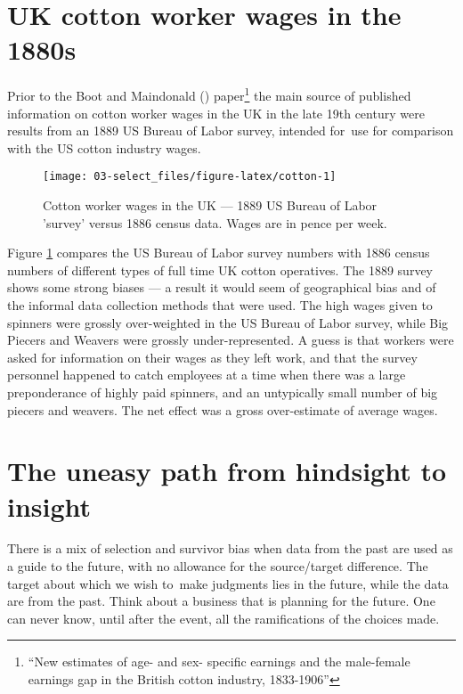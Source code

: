 \documentclass[
  10ptls,
  b5paper]{book}
\begin{document}
\section{UK cotton worker wages in the 1880s}\label{uk-cotton-worker-wages-in-the-1880s}

Prior to the Boot and Maindonald () paper\footnote{``New estimates of age- and sex- specific
  earnings and the male-female earnings gap in the British cotton
  industry, 1833-1906''} the main source of published information on
cotton worker wages in the UK in the late 19th century were results
from an 1889 US Bureau of Labor survey, intended for~use for
comparison with the US cotton industry wages.

\begin{figure}

{\centering \texttt{[image: 03-select\_files/figure-latex/cotton-1]} 

}

\caption{Cotton worker wages in the UK --- 1889 US Bureau of Labor 'survey'
versus 1886 census data. Wages are in pence per week.}\label{fig:cotton}
\end{figure}

Figure \ref{fig:cotton} compares the US Bureau of Labor
survey numbers with 1886 census numbers of different types
of full time UK cotton operatives.
The 1889 survey shows some strong biases --- a result it
would seem of geographical bias and of the informal data
collection methods that were used. The high wages given to
spinners were grossly over-weighted in the US Bureau of
Labor survey, while Big Piecers and Weavers were grossly
under-represented. A guess is that workers were asked for
information on their wages as they left work, and that
the survey personnel happened to catch employees at a time
when there was a large preponderance of highly paid spinners,
and an untypically small number of big piecers and weavers.
The net effect was a gross over-estimate of average wages.

\section{The uneasy path from hindsight to insight}\label{the-uneasy-path-from-hindsight-to-insight}

There is a mix of selection and survivor bias when data
from the past are used as a guide to the future, with no
allowance for the source/target difference. The target about
which we wish to~make judgments lies in the future, while the
data are from the past. Think about a business that is
planning for the future. One can never know, until after the
event, all the ramifications of the choices made.
\end{document}
